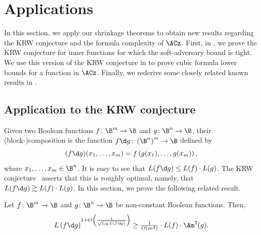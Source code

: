 \section{\label{sec:applications}Applications}

In this section, we apply our shrinkage theorems to obtain new results
regarding the KRW conjecture and the formula complexity of $\ACz$.
First, in , we prove the KRW conjecture for inner
functions for which the soft-adversary bound is tight. We use this
version of the KRW conjecture in  to prove
cubic formula lower bounds for a function in $\ACz$. Finally, we
rederive some closely related known results in .

\subsection{\label{subsec:KRW}Application to the KRW conjecture}

Given two Boolean functions $f\colon\B^{m}\to\B$ and $g\colon\B^{n}\to\B$,
their (block-)\-composition is the function $f\d g\colon\left(\B^{n}\right)^{m}\to\B$
defined by 
\[
(f\d g)(x_{1},\ldots,x_{m})=f\left(g(x_{1}),\ldots,g(x_{m})\right),
\]
where $x_{1},\ldots,x_{m}\in\B^{n}$. It is easy to see that $L(f\d g)\le L(f)\cdot L(g)$.
The KRW conjecture~\cite{KRW95} asserts that this is roughly optimal,
namely, that $L(f\d g)\gtrsim L(f)\cdot L(g)$. In this section,
we prove the following related result. 
\begin{theorem}
\label{thm:composition-theorem}Let $f\colon\B^{m}\to\B$ and $g\colon\B^{n}\to\B$
be non-constant Boolean functions. Then, 
\[
L\left(f\d g\right)^{1+O\left(\frac{1}{\sqrt{\log L(f\d g)}}\right)}\geq\tfrac{1}{O(m^{4})}\cdot L(f)\cdot\Am^{2}(g).
\]
\end{theorem}
%
%
%
%
%
%
%
%
%
%
%
%
%

